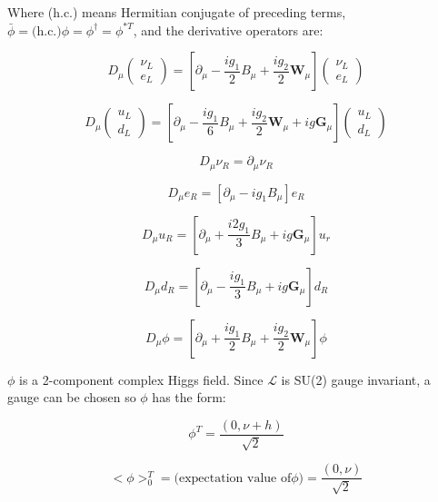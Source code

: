 \documentclass[12pt,a4paper,pagesize=pdftex]{scrartcl}
\newcommand{\icol}[1]{%
  \left(\begin{smallmatrix}#1\end{smallmatrix}\right)%
}
\begin{document}
Where (h.c.) means Hermitian conjugate of preceding terms, $\bar{\phi}=\text{(h.c.)}\phi=\phi^\dagger=\phi^{*T}$, and the derivative operators are:

\begin{equation*}
	D_\mu\icol{\nu_L\\e_L}=\left[\partial_\mu-\frac{ig_1}{2}B_\mu+\frac{ig_2}{2}\mathbf{W}_\mu\right]\icol{\nu_L\\e_L}
\end{equation*}

\begin{equation*}
	D_\mu\icol{u_L\\d_L}=\left[\partial_\mu-\frac{ig_1}{6}B_\mu+\frac{ig_2}{2}\mathbf{W}_\mu+ig\mathbf{G}_\mu\right]\icol{u_L\\d_L}
\end{equation*}

\begin{equation*}
	D_\mu\nu_R=\partial_\mu\nu_R
\end{equation*}

\begin{equation*}
	D_\mu e_R=\left[\partial_\mu-ig_1B_\mu\right]e_R
\end{equation*}

\begin{equation*}
	D_\mu u_R=\left[\partial_\mu+\frac{i2g_1}{3}B_\mu+ig\mathbf{G}_\mu\right]u_r
\end{equation*}

\begin{equation*}
	D_\mu d_R=\left[\partial_\mu - \frac{ig_1}{3}B_\mu+ig\mathbf{G}_\mu\right]d_R
\end{equation*}

\begin{equation*}
	D_\mu\phi=\left[\partial_\mu+\frac{ig_1}{2}B_\mu+\frac{ig_2}{2}\mathbf{W}_\mu\right]\phi
\end{equation*}

$\phi$ is a 2-component complex Higgs field. Since $\mathcal{L}$ is SU(2) gauge invariant, a gauge can be chosen so $\phi$ has the form:

\begin{equation*}
	\phi^T=\frac{\left(0,\nu+h\right)}{\sqrt{2}}
\end{equation*}

\begin{equation*}
	<\phi>_0^T=\text{(expectation value of}\phi)=\frac{\left(0,\nu\right)}{\sqrt{2}}
\end{equation*}
\end{document}
